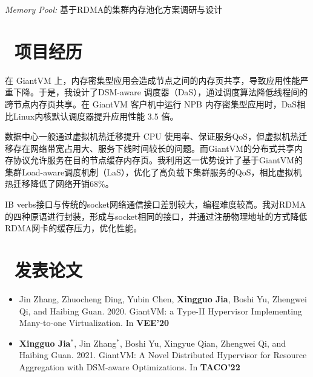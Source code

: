 \documentclass{resume}
\begin{document}
{\textit{Memory Pool:} 基于RDMA的集群内存池化方案调研与设计

\section{\faInfo\ 项目经历}

在 GiantVM 上，内存密集型应用会造成节点之间的内存页共享，导致应用性能严重下降。于是，我设计了DSM-aware 调度器（DaS），通过调度算法降低线程间的跨节点内存页共享。在 GiantVM 客户机中运行 NPB 内存密集型应用时，DaS相比Linux内核默认调度器提升应用性能 3.5 倍。


数据中心一般通过虚拟机热迁移提升 CPU 使用率、保证服务QoS，但虚拟机热迁移存在网络带宽占用大、服务下线时间较长的问题。而GiantVM的分布式共享内存协议允许服务在目的节点缓存内存页。我利用这一优势设计了基于GiantVM的集群Load-aware调度机制（LaS），优化了高负载下集群服务的QoS，相比虚拟机热迁移降低了网络开销68\%。


IB verbs接口与传统的socket网络通信接口差别较大，编程难度较高。我对RDMA的四种原语进行封装，形成与socket相同的接口，并通过注册物理地址的方式降低RDMA网卡的缓存压力，优化性能。

\section{\faGraduationCap\ 发表论文}
\begin{itemize}
\item Jin Zhang, Zhuocheng Ding, Yubin Chen, \textbf{Xingguo Jia}, Boshi Yu, Zhengwei Qi, and Haibing Guan. 2020. GiantVM: a Type-II Hypervisor Implementing Many-to-one Virtualization. In \textbf{VEE'20}
\item \textbf{Xingguo Jia$^*$}, Jin Zhang$^*$, Boshi Yu, Xingyue Qian, Zhengwei Qi, and Haibing Guan. 2021. GiantVM: A Novel Distributed Hypervisor for Resource Aggregation with DSM-aware Optimizations. In \textbf{TACO'22}
\end{itemize}

}
\end{document}
